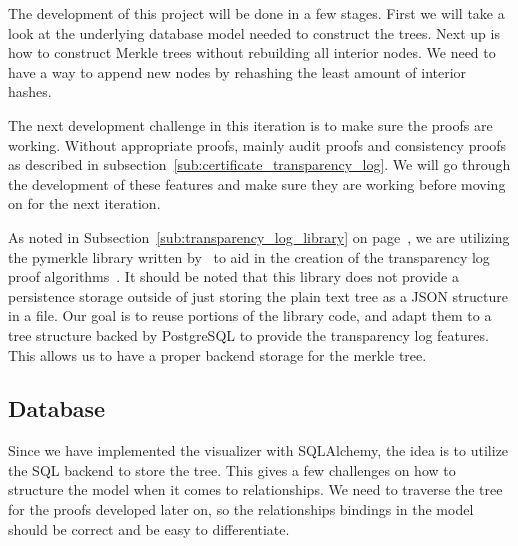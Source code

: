 \documentclass[../Main/thesis.tex]{subfiles}
\begin{document}
The development of this project will be done in a few stages. First we will take
a look at the underlying database model needed to construct the trees. Next up
is how to construct Merkle trees without rebuilding all interior nodes. We need
to have a way to append new nodes by rehashing the least amount of interior
hashes.

The next development challenge in this iteration is to make sure the proofs are
working. Without appropriate proofs, mainly audit proofs and consistency proofs
as described in subsection~\ref{sub:certificate_transparency_log}. We will go
through the development of these features and make sure they are working before
moving on for the next iteration.

As noted in Subsection~\ref{sub:transparency_log_library} on
page~\pageref{sub:transparency_log_library}, we are utilizing the pymerkle 
library written by~\citeauthor{pymerkeltools} to aid in the creation of the
transparency log proof algorithms~\cite{pymerkeltools}. It should be noted that
this library does not provide a persistence storage outside of just storing the
plain text tree as a JSON structure in a file. Our goal is to reuse portions of
the library code, and adapt them to a tree structure backed by PostgreSQL to
provide the transparency log features. This allows us to have a proper backend
storage for the merkle tree.


\subsection*{Database}%
\label{sub:database}
Since we have implemented the visualizer with SQLAlchemy, the idea is to
utilize the SQL backend to store the tree. This gives a few challenges on how to
structure the model when it comes to relationships. We need to traverse the
tree for the proofs developed later on, so the relationships bindings in the
model should be correct and be easy to differentiate.
\end{document}
